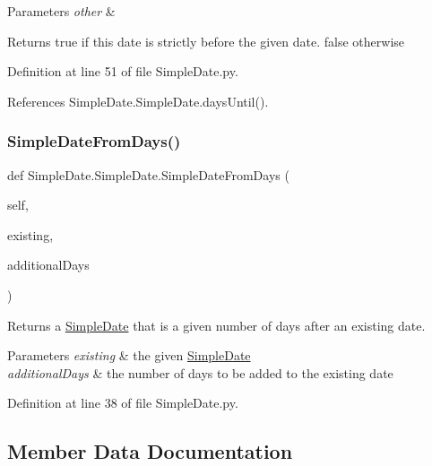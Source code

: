 \begin{DoxyParams}{Parameters}
{\em other} & \\
\hline
\end{DoxyParams}
\begin{DoxyReturn}{Returns}
true if this date is strictly before the given date. false otherwise 
\end{DoxyReturn}


Definition at line 51 of file Simple\+Date.\+py.



References Simple\+Date.\+Simple\+Date.\+days\+Until().

\mbox{\label{classSimpleDate_1_1SimpleDate_a84c11740813035133e89c4f55d35268d}} 
\subsubsection{\texorpdfstring{Simple\+Date\+From\+Days()}{SimpleDateFromDays()}}
{\footnotesize\ttfamily def Simple\+Date.\+Simple\+Date.\+Simple\+Date\+From\+Days (\begin{DoxyParamCaption}\item[{}]{self,  }\item[{}]{existing,  }\item[{}]{additional\+Days }\end{DoxyParamCaption})}



Returns a \hyperlink{classSimpleDate_1_1SimpleDate}{Simple\+Date} that is a given number of days after an existing date. 


\begin{DoxyParams}{Parameters}
{\em existing} & the given \hyperlink{classSimpleDate_1_1SimpleDate}{Simple\+Date} \\
\hline
{\em additional\+Days} & the number of days to be added to the existing date \\
\hline
\end{DoxyParams}


Definition at line 38 of file Simple\+Date.\+py.



\subsection{Member Data Documentation}
\mbox{\label{classSimpleDate_1_1SimpleDate_a0ae516370c49819c39e89606e163a875}} 
